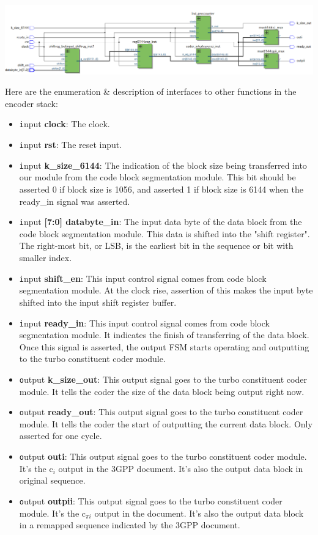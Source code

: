\documentclass[letterpaper, 12pt]{article} %
\begin{document}
\begin{center}
    \includegraphics[width=\textwidth]{files/rtl_all}
\end{center}
Here are the enumeration \& description of interfaces to other functions in the encoder stack:
\begin{itemize}
    \item {\texttt input} {\bf clock}: The clock.
    \item {\texttt input} {\bf rst}: The reset input.
    \item {\texttt input} {\bf k\_size\_6144}: The indication of the block size being transferred into our module from the code block segmentation module. This bit should be asserted 0 if block size is 1056, and asserted 1 if block size is 6144 when the ready\_in signal was asserted.
    \item {\texttt input} {\bf [7:0] databyte\_in}: The input data byte of the data block from the code block segmentation module. This data is shifted into the "shift register". The right-most bit, or LSB, is the earliest bit in the sequence or bit with smaller index.
    \item {\texttt input} {\bf shift\_en}: This input control signal comes from code block segmentation module. At the clock rise, assertion of this makes the input byte shifted into the input shift register buffer.
    \item {\texttt input} {\bf ready\_in}: This input control signal comes from code block segmentation module. It indicates the finish of transferring of the data block. Once this signal is asserted, the output FSM starts operating and outputting to the turbo constituent coder module.
    \item {\texttt output} {\bf k\_size\_out}: This output signal goes to the turbo constituent coder module. It tells the coder the size of the data block being output right now.
    \item {\texttt output} {\bf ready\_out}: This output signal goes to the turbo constituent coder module. It tells the coder the start of outputting the current data block. Only asserted for one cycle.
    \item {\texttt output} {\bf outi}: This output signal goes to the turbo constituent coder module. It's the c$_i$ output in the 3GPP document. It's also the output data block in original sequence.
    \item {\texttt output} {\bf outpii}: This output signal goes to the turbo constituent coder module. It's the c$_{\pi i}$ output in the document. It's also the output data block in a remapped sequence indicated by the 3GPP document.
\end{itemize}
\end{document}
